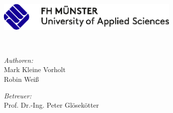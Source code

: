 
\begin{titlepage}
	\begin{center}
        \large  

        \hfill

        \vfill
        
        \includegraphics[width=9cm]{Figures/Logo-FH-Muenster} \\ \medskip
        
        \myDepartment
        
        \vfill

        \begingroup
            \color{Maroon}\spacedallcaps{\Large\myTitle} \\ \bigskip
        \endgroup

        \spacedlowsmallcaps{\myName}
        
        \vfill
        
        \begin{minipage}{0.4\textwidth}
			\begin{flushleft}
			\emph{Authoren:} \\
			Mark Kleine Vorholt\\
			Robin Wei\ss{}
			\end{flushleft}
			\end{minipage}
			\hfill
			\begin{minipage}{0.5\textwidth}
			\begin{flushright}
			\emph{Betreuer:} \\
			Prof. Dr.-Ing. Peter Glösekötter
			\end{flushright}
		\end{minipage}

        
        \vfill
        
        \textit{\mySubtitle} \\
            
        \vfill              
        
        \myTime   
        
        \vfill  

	\end{center}     
\end{titlepage}   